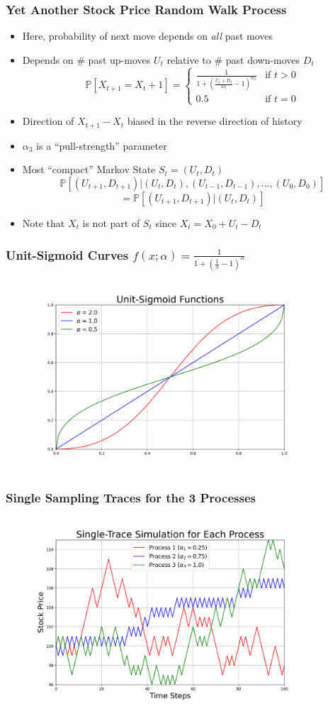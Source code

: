 \documentclass[handout]{beamer}
\begin{document}
\begin{frame}
\frametitle{Yet Another Stock Price Random Walk Process}
\pause
\begin{itemize}[<+->]
\item Here, probability of next move depends on {\em all} past moves
\item Depends on \# past up-moves $U_t$ relative to \# past down-moves $D_t$
$$
\mathbb{P}[X_{t+1} = X_t + 1] =
\begin{cases}
\frac 1 {1 + (\frac {U_t + D_t} {D_t} - 1)^{\alpha_3}} & \text{if } t > 0\\
0.5 & \text{if } t = 0
\end{cases}
$$
\item Direction of $X_{t+1} - X_t$ biased in the reverse direction of history
\item $\alpha_3$ is a ``pull-strength'' parameter
\item Most ``compact'' Markov State $S_t = (U_t, D_t)$
$$\mathbb{P}[(U_{t+1}, D_{t+1})|(U_t, D_t), (U_{t-1}, D_{t-1}), \ldots, (U_0, D_0)]$$
$$ = \mathbb{P}[(U_{t+1}, D_{t+1})|(U_t, D_t)]$$
\item Note that $X_t$ is not part of $S_t$ since $X_t = X_0 + U_t - D_t$
\end{itemize}
\end{frame}

\begin{frame}
\frametitle{Unit-Sigmoid Curves $f(x; \alpha) = \frac 1 {1 + (\frac 1 x - 1)^{\alpha}}$}
\includegraphics[width=12cm, height=7cm]{unit_sigmoid_curves.png}
\end{frame}

\begin{frame}
\frametitle{Single Sampling Traces for the 3 Processes}
\includegraphics[width=12cm, height=7cm]{single_traces.png}
\end{frame}
\end{document}
